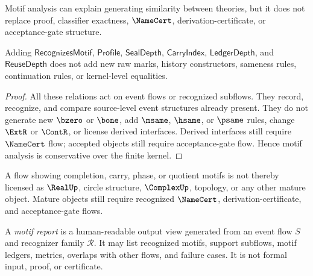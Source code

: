 \begin{corollary}
\label{cor:motif-generated-explanatory-not-identity-proof}
Motif analysis can explain generating similarity between theories, but it does not replace proof, classifier exactness, $\NameCert$, derivation-certificate, or acceptance-gate structure.
\end{corollary}

\begin{theorem}
\label{thm:motif-generated-conservativity}
Adding $\mathsf{RecognizesMotif}$, $\mathsf{Profile}$, $\mathsf{SealDepth}$, $\mathsf{CarryIndex}$, $\mathsf{LedgerDepth}$, and $\mathsf{ReuseDepth}$ does not add new raw marks, history constructors, sameness rules, continuation rules, or kernel-level equalities.
\end{theorem}

\begin{proof}
All these relations act on event flows or recognized subflows. They record, recognize, and compare source-level event structures already present. They do not generate new $\bzero$ or $\bone$, add $\msame$, $\hsame$, or $\psame$ rules, change $\ExtR$ or $\ContR$, or license derived interfaces. Derived interfaces still require $\NameCert$ flow; accepted objects still require acceptance-gate flow. Hence motif analysis is conservative over the finite kernel.
\end{proof}

\begin{corollary}
\label{cor:motif-generated-cannot-license-mature-objects}
A flow showing completion, carry, phase, or quotient motifs is not thereby licensed as $\RealUp$, circle structure, $\ComplexUp$, topology, or any other mature object. Mature objects still require recognized $\NameCert$, derivation-certificate, and acceptance-gate flows.
\end{corollary}

\begin{definition}
\label{def:motif-generated-report}
A \emph{motif report} is a human-readable output view generated from an event flow $S$ and recognizer family $\mathcal R$. It may list recognized motifs, support subflows, motif ledgers, metrics, overlaps with other flows, and failure cases. It is not formal input, proof, or certificate.
\end{definition}

